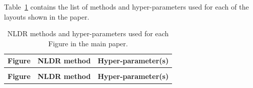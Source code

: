 \documentclass[
  11pt,
  a4paper,
]{report}
\begin{document}
Table~\ref{tbl-fig-param} contains the list of methods and
hyper-parameters used for each of the layouts shown in the paper.

\begingroup\fontsize{12}{14}\selectfont

\begin{longtable}{>{\raggedright\arraybackslash}p{1.5cm}>{\raggedright\arraybackslash}p{2cm}>{\raggedright\arraybackslash}p{10cm}}

\caption{\label{tbl-fig-param}NLDR methods and hyper-parameters used for
each Figure in the main paper.}

\tabularnewline

\toprule
\textbf{Figure} & \textbf{NLDR method} & \textbf{Hyper-parameter(s)}\\
\midrule
\endfirsthead
\multicolumn{3}{@{}l}{\textit{(continued)}}\\
\toprule
\textbf{Figure} & \textbf{NLDR method} & \textbf{Hyper-parameter(s)}\\
\midrule
\endhead


\end{longtable}
\end{document}
